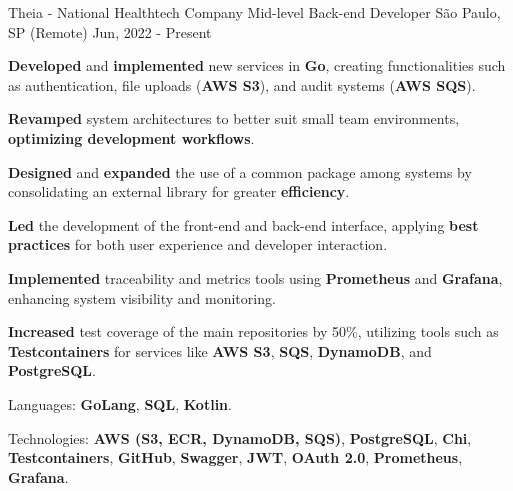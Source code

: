 
\begin{cventries}
  \cventry
  {Theia - National Healthtech Company} %
  {Mid-level Back-end Developer} %
  {São Paulo, SP (Remote)} %
  {Jun, 2022 - Present} %
  {
    \begin{cvitems}
      \item {\textbf{Developed} and \textbf{implemented} new services in \textbf{Go}, creating functionalities such as authentication, file uploads (\textbf{AWS S3}), and audit systems (\textbf{AWS SQS}).}
      \item {\textbf{Revamped} system architectures to better suit small team environments, \textbf{optimizing development workflows}.}
      \item {\textbf{Designed} and \textbf{expanded} the use of a common package among systems by consolidating an external library for greater \textbf{efficiency}.}
      \item {\textbf{Led} the development of the front-end and back-end interface, applying \textbf{best practices} for both user experience and developer interaction.}
      \item {\textbf{Implemented} traceability and metrics tools using \textbf{Prometheus} and \textbf{Grafana}, enhancing system visibility and monitoring.}
      \item {\textbf{Increased} test coverage of the main repositories by 50\%, utilizing tools such as \textbf{Testcontainers} for services like \textbf{AWS S3}, \textbf{SQS}, \textbf{DynamoDB}, and \textbf{PostgreSQL}.}
      \item {Languages: \textbf{GoLang}, \textbf{SQL}, \textbf{Kotlin}.}
      \item {Technologies: \textbf{AWS (S3, ECR, DynamoDB, SQS)}, \textbf{PostgreSQL}, \textbf{Chi}, \textbf{Testcontainers}, \textbf{GitHub}, \textbf{Swagger}, \textbf{JWT}, \textbf{OAuth 2.0}, \textbf{Prometheus}, \textbf{Grafana}.}
    \end{cvitems}
  }


\end{cventries}
